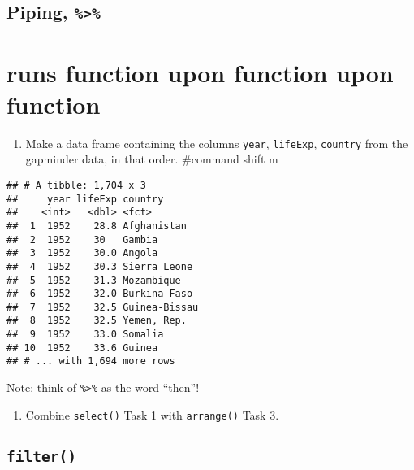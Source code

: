 \documentclass[]{article}
\newenvironment{Shaded}{\begin{snugshade}}{\end{snugshade}}
\newcommand{\KeywordTok}[1]{\textcolor[rgb]{0.13,0.29,0.53}{\textbf{{#1}}}}
\newcommand{\StringTok}[1]{\textcolor[rgb]{0.31,0.60,0.02}{{#1}}}
\newcommand{\NormalTok}[1]{{#1}}
\providecommand{\tightlist}{%
  \setlength{\itemsep}{0pt}\setlength{\parskip}{0pt}}
\begin{document}
\subsection{\texorpdfstring{Piping,
\texttt{\%\textgreater{}\%}}{Piping, \%\textgreater{}\%}}\label{piping}

\section{runs function upon function upon
function}\label{runs-function-upon-function-upon-function}

\begin{enumerate}
\def\labelenumi{\arabic{enumi}.}
\tightlist
\item
  Make a data frame containing the columns \texttt{year},
  \texttt{lifeExp}, \texttt{country} from the gapminder data, in that
  order. \#command shift m
\end{enumerate}

\begin{Shaded}
\end{Shaded}

\begin{verbatim}
## # A tibble: 1,704 x 3
##     year lifeExp country      
##    <int>   <dbl> <fct>        
##  1  1952    28.8 Afghanistan  
##  2  1952    30   Gambia       
##  3  1952    30.0 Angola       
##  4  1952    30.3 Sierra Leone 
##  5  1952    31.3 Mozambique   
##  6  1952    32.0 Burkina Faso 
##  7  1952    32.5 Guinea-Bissau
##  8  1952    32.5 Yemen, Rep.  
##  9  1952    33.0 Somalia      
## 10  1952    33.6 Guinea       
## # ... with 1,694 more rows
\end{verbatim}

Note: think of \texttt{\%\textgreater{}\%} as the word ``then''!

\begin{enumerate}
\def\labelenumi{\arabic{enumi}.}
\tightlist
\item
  Combine \texttt{select()} Task 1 with \texttt{arrange()} Task 3.
\end{enumerate}

\subsection{\texorpdfstring{\texttt{filter()}}{filter()}}\label{filter}
\end{document}
